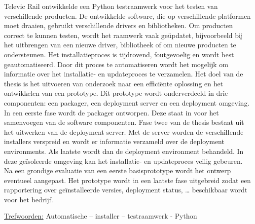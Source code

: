 Televic Rail ontwikkelde een Python testraamwerk voor het testen van verschillende producten. De ontwikkelde software, die op verschillende platformen moet draaien, gebruikt verschillende drivers en bibliotheken. Om producten correct te kunnen testen, wordt het raamwerk vaak geüpdatet, bijvoorbeeld bij het uitbrengen van een nieuwe driver, bibliotheek of om nieuwe producten te ondersteunen. Het installatieproces is tijdrovend, foutgevoelig en wordt best geautomatiseerd. Door dit proces te automatiseren wordt het mogelijk om informatie over het installatie- en updateproces te verzamelen. Het doel van de thesis is het uitvoeren van onderzoek naar een efficiënte oplossing en het ontwikkelen van een prototype. Dit prototype wordt onderverdeeld in drie componenten: een packager, een deployment server en een deployment omgeving. In een eerste fase wordt de packager ontworpen. Deze staat in voor het samenvoegen van de software componenten. Fase twee van de thesis bestaat uit het uitwerken van de deployment server. Met de server worden de verschillende installers verspreid en wordt er informatie verzameld over de deployment environments. Als laatste wordt dan de deployment environment behandeld. In deze geïsoleerde omgeving kan het installatie- en updateproces veilig gebeuren. Na een grondige evaluatie van een eerste basisprototype wordt het ontwerp eventueel aangepast. Het prototype wordt in een laatste fase uitgebreid zodat een rapportering over geïnstalleerde versies, deployment status, … beschikbaar wordt voor het bedrijf.

\underline{Trefwoorden:} Automatische – installer –  testraamwerk - Python